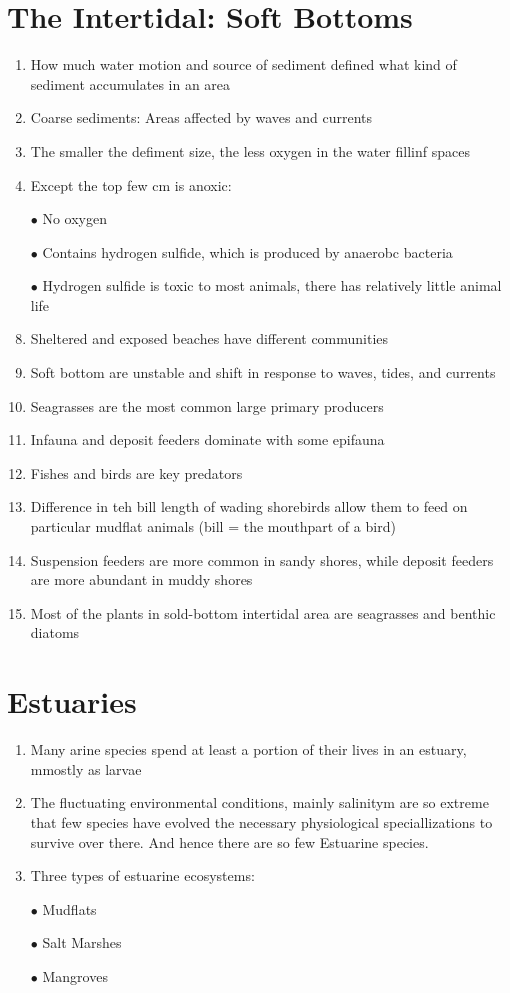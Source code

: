 \documentclass{report}
\begin{document}
\section{The Intertidal: Soft Bottoms}
\begin{enumerate}
    \item How much water motion and source of sediment defined what kind of sediment accumulates in an area 
    \item Coarse sediments: Areas affected by waves and currents 
    \item The smaller the defiment size, the less oxygen in the water fillinf spaces 
    \item Except the top few cm is anoxic:
    \item [$\bullet$]No oxygen
    \item [$\bullet$]Contains hydrogen sulfide, which is produced by anaerobc bacteria 
    \item [$\bullet$]Hydrogen sulfide is toxic to most animals, there has relatively little animal life 
    \item Sheltered and exposed beaches have different communities 
    \item Soft bottom are unstable and shift in response to waves, tides, and currents
    \item Seagrasses are the most common large primary producers 
    \item Infauna and deposit feeders dominate with some epifauna 
    \item Fishes and birds are key predators 
    \item Difference in teh bill length of wading shorebirds allow them to feed on particular mudflat animals (bill = the mouthpart of a bird)
    \item Suspension feeders are more common in sandy shores, while deposit feeders are more abundant in muddy shores 
    \item Most of the plants in sold-bottom intertidal area are seagrasses and benthic diatoms 
\end{enumerate}


\section{Estuaries}
\begin{enumerate}
    \item Many arine species spend at least a portion of their lives in an estuary, mmostly as larvae
    \item The fluctuating environmental conditions, mainly salinitym are so extreme that few species have evolved the necessary physiological speciallizations to survive over there. And hence there are so few Estuarine species.
    \item Three types of estuarine ecosystems:
    \item [$\bullet$]Mudflats
    \item [$\bullet$]Salt Marshes
    \item [$\bullet$]Mangroves 
\end{enumerate}
\end{document}

